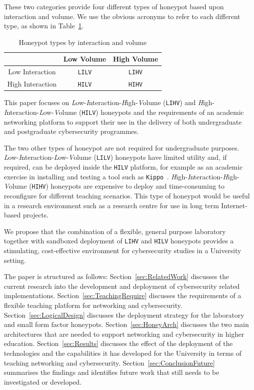 \documentclass[10pt,journal]{IEEEtran}
\begin{document}
These two categories provide four different types of honeypot based upon
interaction and volume. We use the obvious acronyms to refer to each different
type, as shown in Table~\ref{table:HoneypotTypes}.

\begin{table}[ht]
\caption{Honeypot types by interaction and volume\label{table:HoneypotTypes}}
\begin{center}
\begin{tabular}{| c | c| c |}
\hline
 & Low Volume & High Volume \\
\hline
Low Interaction & \texttt{LILV} & \texttt{LIHV} \\
\hline
High Interaction & \texttt{HILV} & \texttt{HIHV} \\
\hline
\end{tabular}
\end{center}
\end{table}

This paper focuses on \emph{L}ow-\-\emph{I}nteraction-\-\emph{H}igh-\-\emph{V}olume
(\texttt{LIHV}) and \emph{H}igh- \\ \emph{I}nteraction-\-\emph{L}ow-\-\emph{V}olume
(\texttt{HILV}) honeypots and the requirements of an academic networking
platform to support their use in the delivery of both undergraduate and
postgraduate cybersecurity programmes.

The two other types of honeypot are not required for undergraduate purposes.
\emph{L}ow-\emph{I}nteraction-\emph{L}ow-\emph{V}olume (\texttt{LILV})
honeypots have limited utility and, if required,  can be deployed inside the
\texttt{HILV} platform, for example as an academic exercise in installing and
testing a tool such as \texttt{Kippo}~\cite{SH:15}.
\emph{H}igh-\emph{I}nteraction-\emph{H}igh-\emph{V}olume (\texttt{HIHV})
honeypots are expensive to deploy and time-consuming to reconfigure for
different teaching scenarios. This type of honeypot would be useful in a
research environment such as a research centre for use in long term
Internet-based projects. 

We propose that the combination of a flexible, general purpose laboratory
together with sandboxed deployment of \texttt{LIHV} and \texttt{HILV} honeypots provides 
a stimulating, cost-effective environment for cybersecurity studies
in a University setting.

The paper is structured as follows: Section~\ref{sec:RelatedWork} discusses the current research into the development and deployment of cybersecurity related implementations. Section~\ref{sec:TeachingRequire} discusses the requirements of a flexible teaching platform for networking and cybersecurity. Section~\ref{sec:LogicalDesign} discusses the deployment strategy for the laboratory and small form factor honeypots. Section~\ref{sec:HoneyArch} discusses the two main architectures that are needed to support networking and cybersecurity in higher education. Section~\ref{sec:Results} discusses the effect of the deployment of the technologies and the capabilities it has developed for the University in terms of teaching networking and cybersecurity. Section~\ref{sec:ConclusionFuture} summarises the findings and identifies future work that still needs to be investigated or developed.
\end{document}
